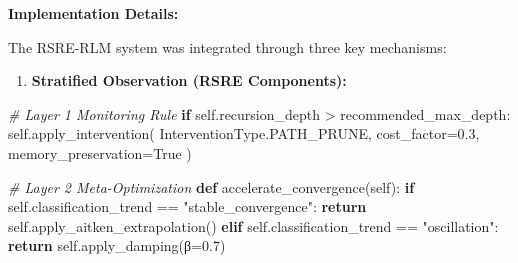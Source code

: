 \documentclass[
]{article}
\newenvironment{Shaded}{}{}
\newcommand{\CommentTok}[1]{\textcolor[rgb]{0.38,0.63,0.69}{\textit{#1}}}
\newcommand{\ControlFlowTok}[1]{\textcolor[rgb]{0.00,0.44,0.13}{\textbf{#1}}}
\newcommand{\FloatTok}[1]{\textcolor[rgb]{0.25,0.63,0.44}{#1}}
\newcommand{\KeywordTok}[1]{\textcolor[rgb]{0.00,0.44,0.13}{\textbf{#1}}}
\newcommand{\NormalTok}[1]{#1}
\newcommand{\OperatorTok}[1]{\textcolor[rgb]{0.40,0.40,0.40}{#1}}
\newcommand{\StringTok}[1]{\textcolor[rgb]{0.25,0.44,0.63}{#1}}
\newcommand{\VariableTok}[1]{\textcolor[rgb]{0.10,0.09,0.49}{#1}}
\providecommand{\tightlist}{%
  \setlength{\itemsep}{0pt}\setlength{\parskip}{0pt}}
\begin{document}
\textbf{Implementation Details:}

The RSRE-RLM system was integrated through three key mechanisms:

\begin{enumerate}
\def\labelenumi{\arabic{enumi}.}
\tightlist
\item
  \textbf{Stratified Observation (RSRE Components):}
\end{enumerate}

\begin{Shaded}
\begin{Highlighting}[]
\CommentTok{\# Layer 1 Monitoring Rule}
\ControlFlowTok{if} \VariableTok{self}\NormalTok{.recursion\_depth }\OperatorTok{\textgreater{}}\NormalTok{ recommended\_max\_depth:}
    \VariableTok{self}\NormalTok{.apply\_intervention(}
\NormalTok{        InterventionType.PATH\_PRUNE,}
\NormalTok{        cost\_factor}\OperatorTok{=}\FloatTok{0.3}\NormalTok{,}
\NormalTok{        memory\_preservation}\OperatorTok{=}\VariableTok{True}
\NormalTok{    )}

\CommentTok{\# Layer 2 Meta{-}Optimization}
\KeywordTok{def}\NormalTok{ accelerate\_convergence(}\VariableTok{self}\NormalTok{):}
    \ControlFlowTok{if} \VariableTok{self}\NormalTok{.classification\_trend }\OperatorTok{==} \StringTok{"stable\_convergence"}\NormalTok{:}
        \ControlFlowTok{return} \VariableTok{self}\NormalTok{.apply\_aitken\_extrapolation()}
    \ControlFlowTok{elif} \VariableTok{self}\NormalTok{.classification\_trend }\OperatorTok{==} \StringTok{"oscillation"}\NormalTok{:}
        \ControlFlowTok{return} \VariableTok{self}\NormalTok{.apply\_damping(β}\OperatorTok{=}\FloatTok{0.7}\NormalTok{)}
\end{Highlighting}
\end{Shaded}
\end{document}
